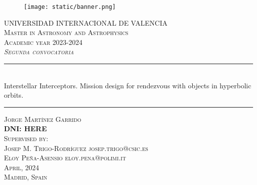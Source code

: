 \begin{titlepage}

  \begin{center}

    \begin{figure}[h]
      \centering
      \texttt{[image: static/banner.png]}
    \end{figure}
    \vspace{1cm}

    \textsc{\large
      UNIVERSIDAD INTERNACIONAL DE VALENCIA
    }\\[0.25cm]
    \textsc{\large
      Master in Astronomy and Astrophysics \\
      Academic year 2023-2024
    }\\[1cm]
    \textsc{\large
      \textit{Segunda convocatoria}
    }\\[1.25cm]

    \noindent\rule{\textwidth}{1pt}
    \\[0.25cm]
    {
    \fontsize{35pt}{35pt}\selectfont
    {
      Interstellar Interceptors. Mission design for rendezvous with objects in hyperbolic orbits.
    }
    }
    \noindent\rule{\textwidth}{1pt}

    \vspace{1.5cm}
    \textsc{\Large
      Jorge Martínez Garrido \\
      \textbf{DNI: HERE}
    }\\[1.25cm]
    \textsc{\large
      Supervised by:
    }\\[0.25cm]
    \textsc{\large
      Josep M. Trigo-Rodríguez josep.trigo@csic.es \\
      Eloy Peña-Asensio eloy.pena@polimi.it
    }\\[1.5cm]

    \textsc{\large
      April, 2024
    }\\[0.25cm]
    \textsc{\large
      Madrid, Spain
    }\\[0.25cm]

  \end{center}
\end{titlepage}
